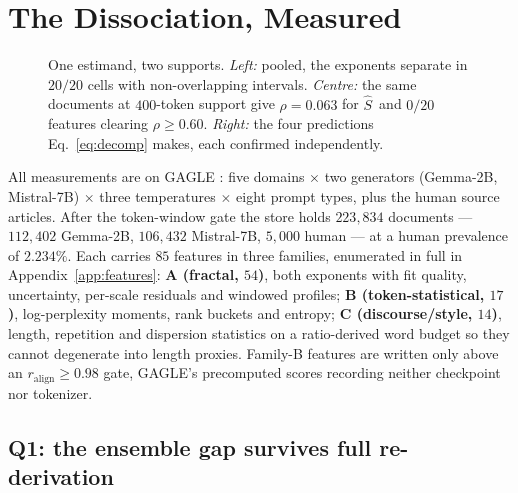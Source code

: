 \documentclass{article}
\newcommand{\Sest}{\ensuremath{\widehat{S}}}
\begin{document}
\section{The Dissociation, Measured}
\label{sec:ensemble}

\begin{figure}[t]
\centering
\resizebox{0.92\linewidth}{!}{}
\caption{One estimand, two supports. \emph{Left:} pooled, the exponents
separate in $20/20$ cells with non-overlapping intervals. \emph{Centre:} the
same documents at $400$-token support give $\rho=0.063$ for \Sest\ and $0/20$
features clearing $\rho\ge0.60$. \emph{Right:} the four predictions
Eq.~\ref{eq:decomp} makes, each confirmed independently.}
\label{fig:dissociation}
\end{figure}

All measurements are on GAGLE \citep{alabdulmohsin2025tale}: five domains $\times$
two generators (Gemma-2B, Mistral-7B) $\times$ three temperatures $\times$ eight
prompt types, plus the human source articles. After the token-window gate the store
holds $223{,}834$ documents --- $112{,}402$ Gemma-2B, $106{,}432$ Mistral-7B,
$5{,}000$ human --- at a human prevalence of $2.234\%$. Each carries $85$ features
in three families, enumerated in full in Appendix~\ref{app:features}: \textbf{A
(fractal, $54$)}, both exponents with fit quality, uncertainty, per-scale residuals
and windowed profiles; \textbf{B (token-statistical, $17$)}, log-perplexity moments,
rank buckets \citep{gehrmann2019gltr} and entropy; \textbf{C (discourse/style,
$14$)}, length, repetition and dispersion statistics on a ratio-derived word budget
so they cannot degenerate into length proxies. Family-B features are written only
above an $r_{\text{align}}\!\ge\!0.98$ gate, GAGLE's precomputed scores recording neither
checkpoint nor tokenizer.

\subsection{Q1: the ensemble gap survives full re-derivation}
\label{sec:ensemble_gap}
\end{document}
